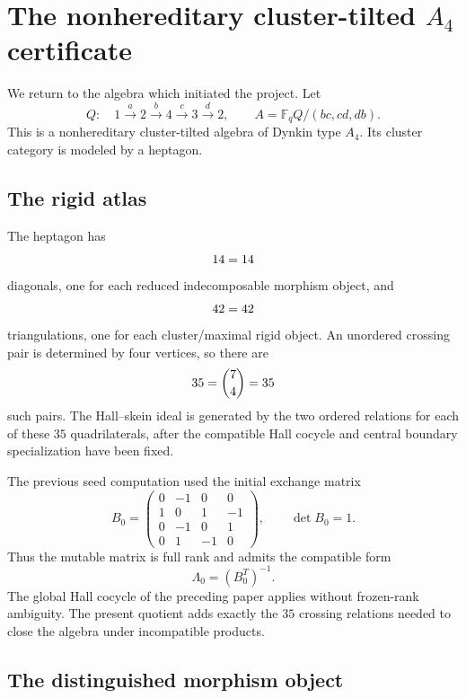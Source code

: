 \section{The nonhereditary cluster-tilted $A_4$ certificate}
\label{sec:A4}

We return to the algebra which initiated the project.  Let
\begin{equation}
 Q:\quad
 1\xrightarrow a2\xrightarrow b4\xrightarrow c3\xrightarrow d2,
 \qquad
 A=\mathbb F_qQ/(bc,cd,db).
 \label{eq:A4-algebra}
\end{equation}
This is a nonhereditary cluster-tilted algebra of Dynkin type $A_4$.  Its
cluster category is modeled by a heptagon.

\subsection{The rigid atlas}

The heptagon has
\[
 14=14
\]
diagonals, one for each reduced indecomposable morphism object, and
\[
 42=42
\]
triangulations, one for each cluster/maximal rigid object.  An unordered
crossing pair is determined by four vertices, so there are
\[
 35=\binom74=35
\]
such pairs.  The Hall--skein ideal is generated by the two ordered relations
for each of these $35$ quadrilaterals, after the compatible Hall cocycle and
central boundary specialization have been fixed.

The previous seed computation used the initial exchange matrix
\begin{equation}
 B_0=
 \begin{pmatrix}
 0&-1&0&0\\
 1&0&1&-1\\
 0&-1&0&1\\
 0&1&-1&0
 \end{pmatrix},
 \qquad \det B_0=1.
 \label{eq:A4-B0}
\end{equation}
Thus the mutable matrix is full rank and admits the compatible form
\[
 \Lambda_0=(B_0^T)^{-1}.
\]
The global Hall cocycle of the preceding paper applies without frozen-rank
ambiguity.  The present quotient adds exactly the $35$ crossing relations
needed to close the algebra under incompatible products.

\subsection{The distinguished morphism object}


